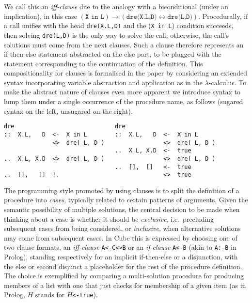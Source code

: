 \documentclass{tlp}
\def\imp{\rightarrow}
\def\bic{\leftrightarrow}
\newcommand{\cube}{\textsf{Cube}}
\def\mite{\textsf{if-then-else}}
\begin{document}
We call this an \emph{iff-clause} due to the analogy with a biconditional
(under an implication), in this case $(\texttt{X in
  L})\imp(\texttt{dre(X.L,D)}\bic\texttt{dre(L,D)})$.  Procedurally, if a call
unifies with the head \verb+dre(X.L,D)+ and the (\verb+X in L+) condition
succeeds, then solving \verb+dre(L,D)+ is the only way to solve the call;
otherwise, the call's solutions must come from the next clauses. Such a clause
therefore represents an \textsf{if-then-else} statement abstracted on the
\textsf{else} part, to be plugged with the statement corresponding to the
continuation of the definition. This compositionality for clauses is formalised
in the paper by considering an extended syntax incorporating variable abstraction
and application as in the $\lambda$-calculus. To make the abstract nature of
clauses even more apparent we introduce syntax to lump them under a single occurrence
of the procedure name, as follows (sugared syntax on the left, unsugared 
on the right).

\vspace{-3.7pt}
\begin{verbatim}
dre                             dre
::  X.L,   D  <-  X in L        ::  X.L,   D  <-  X in L
              <>  dre( L, D )                 <>  dre( L, D )
                                ..  X.L, X.D  <-  true
..  X.L, X.D  <>  dre( L, D )                 <>  dre( L, D )
                                ..  [],  []   <-  true
..  [],   []  !.                              <>  true
\end{verbatim}
\vspace{-3.7pt}

The programming style promoted by using clauses is to split the definition of a
procedure into \emph{cases}, typically related to certain patterns of
arguments. Given the semantic possibility of multiple solutions, the central
decision to be made when thinking about a case is whether it should be
\emph{exclusive}, i.e.\ precluding subsequent cases from being considered, or
\emph{inclusive}, when alternative solutions may come from subsequent cases. In
\cube{} this is expressed by choosing one of two clause formats, an
\emph{iff-clause} \texttt{A<-C<>B} or an \emph{if-clause} \texttt{A<-B} (akin to
\texttt{A:-B} in Prolog), standing respectively for an implicit \mite{} or a
disjunction, with the \textsf{else} or second disjunct a placeholder for
the rest of the procedure definition. The choice is exemplified by comparing a
multi-solution procedure for producing members of a list with one that just
checks for membership of a given item (as in Prolog, $H$ stands for
$H$\texttt{<-true}).
\end{document}
